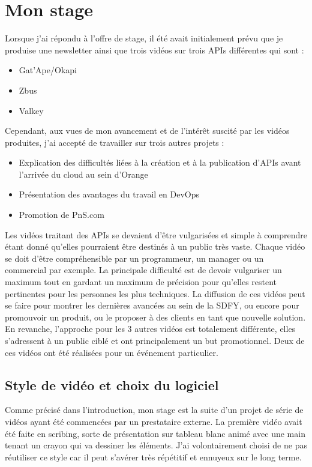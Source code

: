 \chapter{Mon stage}
\label{sec:unchapitre}

Lorsque j'ai répondu à l'offre de stage, il été avait initialement prévu que je produise une newsletter ainsi que trois vidéos sur trois APIs différentes qui sont :

\begin{itemize}
    \item Gat'Ape/Okapi
    \item Zbus
    \item Valkey
\end{itemize}

Cependant, aux vues de mon avancement et de l'intérêt suscité par les vidéos produites, j'ai accepté de travailler sur trois autres projets :

\begin{itemize}
    \item Explication des difficultés liées à la création et à la publication d'APIs avant l'arrivée du cloud au sein d'Orange
    \item Présentation des avantages du travail en DevOps
    \item Promotion de PnS.com
\end{itemize}



Les vidéos traitant des APIs se devaient d'être vulgarisées et simple à comprendre étant donné qu'elles pourraient être destinés à un public très vaste. Chaque vidéo se doit d'être compréhensible par un programmeur, un manager ou un commercial par exemple. La principale difficulté est de devoir vulgariser un maximum tout en gardant un maximum de précision pour qu'elles restent pertinentes pour les personnes les plus techniques. La diffusion de ces vidéos peut se faire pour montrer les dernières avancées au sein de la SDFY, ou encore pour promouvoir un produit, ou le proposer à des clients en tant que nouvelle solution. \\

En revanche, l'approche pour les 3 autres vidéos est totalement différente, elles s'adressent à un public ciblé et ont principalement un but promotionnel. Deux de ces vidéos ont été réalisées pour un événement particulier. \\



\section{Style de vidéo et choix du logiciel}
Comme précisé dans l'introduction, mon stage est la suite d'un projet de série de vidéos ayant été commencées par un prestataire externe. La première vidéo avait été faite en scribing, sorte de présentation sur tableau blanc animé avec une main tenant un crayon qui va dessiner les éléments. J'ai volontairement choisi de ne pas réutiliser ce style car il peut s'avérer très répétitif et ennuyeux sur le long terme.

